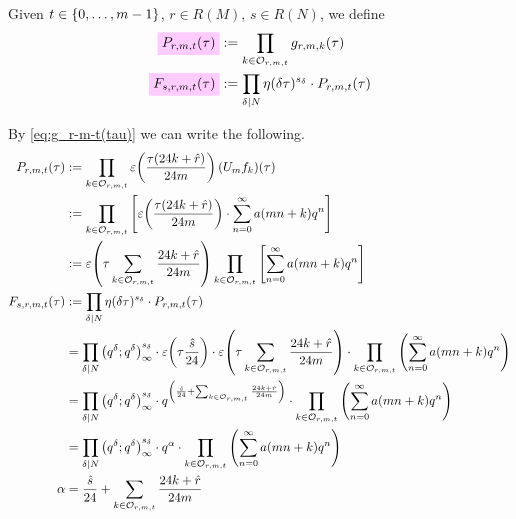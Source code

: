 \documentclass{article}
\begin{document}
\begin{Definition}\cite[Def.~44]{Radu:RamanujanKolberg:2015}
  Given $t\in\left\{0,\ldots,m-1\right\}$, $r \in R(M)$, $s \in R(N)$, we
  define
  \begin{align}
    \defineNotation[P-r-m-t-tau]{P_{r, m, t}(\tau)}
    &:= \prod_{k \in \modularOrbit{r,m,t}} g_{r,m,k}(\tau)\\
    \defineNotation[F-s-r-m-t-tau]{F_{s, r, m, t}(\tau)}
    &:= \divisorprod{N} \eta(\delta\tau)^{s_\delta} \cdot P_{r, m, t}(\tau)
  \end{align}
\end{Definition}

By \eqref{eq:g_r-m-t(tau)} we can write the following.
\begin{align}
  P_{r, m, t}(\tau)
  &:= \prod_{k \in \mathcal{O}_{r,m,t}}
    \varepsilon\!\left(\frac{\tau (24k+\hat{r})}{24m}\right) (U_mf_{k})(\tau)\\
  &:= \prod_{k \in \mathcal{O}_{r,m,t}}
    \left[\varepsilon\!\left(\frac{\tau (24k+\hat{r})}{24m}\right)
    \cdot \sum_{n=0}^\infty a(mn+k) q^n\right]
  \\
  &:= \varepsilon\!\left(\tau\sum_{k\in\mathcal{O}_{r,m,t}}\frac{24k+\hat{r}}{24m}\right)
    \prod_{k \in \mathcal{O}_{r,m,t}} \left[\sum_{n=0}^\infty a(mn+k) q^n\right]
  \\
  F_{s, r, m, t}(\tau)
  &:= \prod_{\delta \mid N} \eta(\delta\tau)^{s_\delta} \cdot P_{r,m,t}(\tau)
  \\
  &= \prod_{\delta \mid N} \left( q^{\delta};q^{\delta} \right)_{\infty}^{s_\delta}
    \cdot
    \varepsilon\!\left(\tau\frac{\hat{s}}{24}\right)
    \cdot
    \varepsilon\!\left(\tau\sum_{k\in\mathcal{O}_{r,m,t}}\frac{24k+\hat{r}}{24m}\right)
    \cdot
    \prod_{k \in \mathcal{O}_{r,m,t}} \left(\sum_{n=0}^\infty a(mn+k) q^n\right)
    \label{eq:F_s-r-m-t(tau)}
  \\
  &= \prod_{\delta \mid N} \left( q^{\delta};q^{\delta} \right)_{\infty}^{s_\delta}
    \cdot
    q^{
    \left(
    \frac{\hat{s}}{24}
    +
    \sum_{k\in\mathcal{O}_{r,m,t}}\frac{24k+\hat{r}}{24m}
    \right)
    }
    \cdot
    \prod_{k \in \mathcal{O}_{r,m,t}} \left(\sum_{n=0}^\infty a(mn+k) q^n\right)
  \\
  &= \prod_{\delta \mid N} \left( q^{\delta};q^{\delta} \right)_{\infty}^{s_\delta}
    \cdot
    q^\alpha
    \cdot
    \prod_{k \in \mathcal{O}_{r,m,t}} \left(\sum_{n=0}^\infty a(mn+k) q^n\right)
  \\
  \alpha
  &=
    \frac{\hat{s}}{24}
    +
    \sum_{k\in\mathcal{O}_{r,m,t}}\frac{24k+\hat{r}}{24m}
    \label{eq:alphaInfinity}
\end{align}
\end{document}

